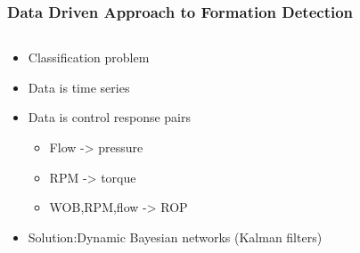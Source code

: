 \documentclass{beamer}
\begin{document}
\begin{frame} \frametitle{Data Driven Approach to Formation Detection} 
\vspace{-1cm}

\begin{columns}[onlytextwidth]
\begin{column}{0.4\textwidth}

\begin{itemize}
\item<2-> Classification problem
\item<5-> Data is time series
\item<6-> Data is control response pairs 
\begin{itemize}
\item<6-> Flow -> pressure
\item<6-> RPM -> torque
\item<6-> WOB,RPM,flow -> ROP
\end{itemize}
\item<7-> Solution:Dynamic Bayesian networks (Kalman filters)
\end{itemize}
 \end{column}

\begin{column}{0.6\textwidth}




\end{column}
\end{columns}
\end{frame}
\end{document}
